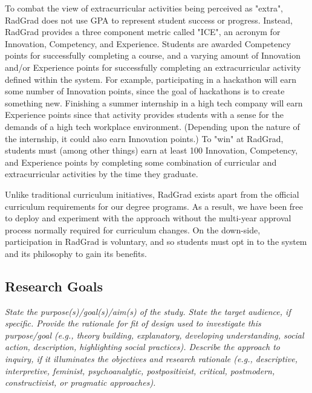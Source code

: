 \documentclass[acmsmall]{acmart}
\begin{document}
To combat the view of extracurricular activities being perceived as "extra", RadGrad does not use GPA to represent student success or progress. Instead, RadGrad provides a three component metric called "ICE", an acronym for Innovation, Competency, and Experience. Students are awarded Competency points for successfully completing a course, and a varying amount of Innovation and/or Experience points for successfully completing an extracurricular activity defined within the system. For example, participating in a hackathon will earn some number of Innovation points, since the goal of hackathons is to create something new.  Finishing a summer internship in a high tech company will earn Experience points since that activity provides students with a sense for the demands of a high tech workplace environment. (Depending upon the nature of the internship, it could also earn Innovation points.) To "win" at RadGrad, students must (among other things) earn at least 100 Innovation, Competency, and Experience points by completing some combination of curricular and extracurricular activities by the time they graduate.

Unlike traditional curriculum initiatives, RadGrad exists apart from the official curriculum requirements for our degree programs. As a result, we have been free to deploy and experiment with the approach without the multi-year approval process normally required for curriculum changes.  On the down-side, participation in RadGrad is voluntary, and so students must opt in to the system and its philosophy to gain its benefits.

\subsection{Research Goals}
{\em\small State the purpose(s)/goal(s)/aim(s) of the study. State the target audience, if specific. Provide the rationale for fit of design used to investigate this purpose/goal (e.g., theory building, explanatory, developing understanding, social action, description, highlighting social practices). Describe the approach to inquiry, if it illuminates the objectives and research rationale (e.g., descriptive, interpretive, feminist, psychoanalytic, postpositivist, critical, postmodern, constructivist, or pragmatic approaches).}
\end{document}
